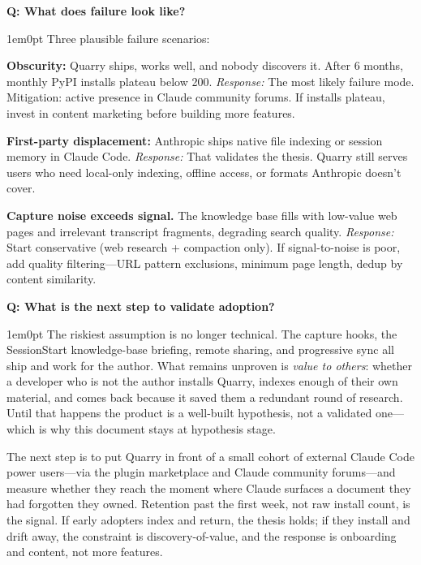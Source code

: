 \documentclass[11pt,letterpaper]{article}
\newcounter{faqnum}
\newenvironment{faqpair}[1]{%
  \needspace{4\baselineskip}%
  \vspace{0.5em}%
  \refstepcounter{faqnum}%
  \noindent\textbf{\color{SectionBlue}Q\thefaqnum: #1}\par\nopagebreak[4]%
  \vspace{0.2em}%
  \begin{adjustwidth}{1em}{0pt}%
  \setlength{\parindent}{0pt}%
}{%
  \end{adjustwidth}%
  \vspace{0.5em}%
}
\begin{document}
\begin{faqpair}{What does failure look like?}\label{faq:failure}
  Three plausible failure scenarios:

  \textbf{Obscurity:} Quarry ships, works well, and nobody discovers it. After
  6 months, monthly PyPI installs plateau below 200. \textit{Response:} The
  most likely failure mode. Mitigation: active presence in Claude community
  forums. If installs plateau, invest in content marketing before building more
  features.

  \textbf{First-party displacement:} Anthropic ships native file indexing or
  session memory in Claude Code. \textit{Response:} That validates the thesis.
  Quarry still serves users who need local-only indexing, offline access, or
  formats Anthropic doesn't cover.

  \textbf{Capture noise exceeds signal.} The knowledge base fills with
  low-value web pages and irrelevant transcript fragments, degrading search
  quality. \textit{Response:} Start conservative (web research + compaction
  only). If signal-to-noise is poor, add quality filtering---URL pattern
  exclusions, minimum page length, dedup by content similarity.
\end{faqpair}

\begin{faqpair}{What is the next step to validate adoption?}\label{faq:next-validation}
  The riskiest assumption is no longer technical. The capture hooks, the
  SessionStart knowledge-base briefing, remote sharing, and progressive sync all
  ship and work for the author. What remains unproven is \emph{value to others}:
  whether a developer who is not the author installs Quarry, indexes enough of
  their own material, and comes back because it saved them a redundant round of
  research. Until that happens the product is a well-built hypothesis, not a
  validated one---which is why this document stays at hypothesis stage.

  The next step is to put Quarry in front of a small cohort of external Claude
  Code power users---via the plugin marketplace and Claude community
  forums---and measure whether they reach the moment where Claude surfaces a
  document they had forgotten they owned. Retention past the first week, not raw
  install count, is the signal. If early adopters index and return, the thesis
  holds; if they install and drift away, the constraint is discovery-of-value,
  and the response is onboarding and content, not more features.
\end{faqpair}
\end{document}
